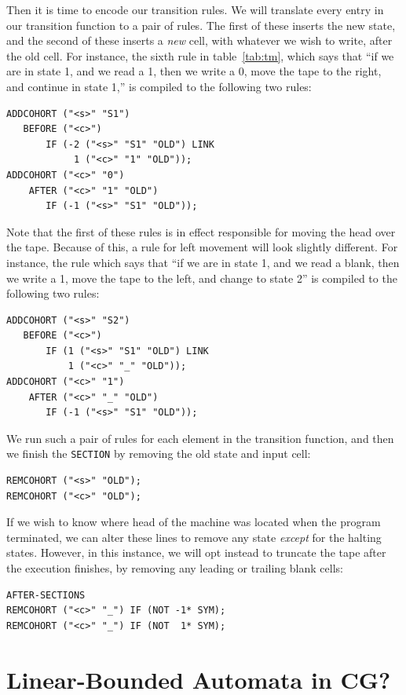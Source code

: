 \documentclass[11pt]{article}
\def\t#1{\texttt{#1}}
\begin{document}
Then it is time to encode our transition rules. We will translate every entry in
our transition function to a pair of rules. The first of these inserts the new
state, and the second of these inserts a \emph{new} cell, with whatever we wish
to write, after the old cell. For instance, the sixth rule in
table~\ref{tab:tm}, which says that ``if we are in state 1, and we read a 1,
then we write a 0, move the tape to the right, and continue in state 1,'' is
compiled to the following two rules:
\begin{Verbatim}
ADDCOHORT ("<s>" "S1")
   BEFORE ("<c>")
       IF (-2 ("<s>" "S1" "OLD") LINK 
            1 ("<c>" "1" "OLD"));
ADDCOHORT ("<c>" "0")
    AFTER ("<c>" "1" "OLD")
       IF (-1 ("<s>" "S1" "OLD"));
\end{Verbatim}
Note that the first of these rules is in effect responsible for moving the head
over the tape. Because of this, a rule for left movement will look slightly
different. For instance, the rule which says that ``if we are in state 1, and we
read a blank, then we write a 1, move the tape to the left, and change to state
2'' is compiled to the following two rules:
\begin{Verbatim}
ADDCOHORT ("<s>" "S2")
   BEFORE ("<c>")
       IF (1 ("<s>" "S1" "OLD") LINK
           1 ("<c>" "_" "OLD"));
ADDCOHORT ("<c>" "1")
    AFTER ("<c>" "_" "OLD")
       IF (-1 ("<s>" "S1" "OLD"));
\end{Verbatim}
We run such a pair of rules for each element in the transition function, and
then we finish the \t{SECTION} by removing the old state and input cell:
\begin{Verbatim}
REMCOHORT ("<s>" "OLD");
REMCOHORT ("<c>" "OLD");
\end{Verbatim}
If we wish to know where head of the machine was located when the program
terminated, we can alter these lines to remove any state \emph{except} for the
halting states. However, in this instance, we will opt instead to truncate the
tape after the execution finishes, by removing any leading or trailing blank
cells:
\begin{Verbatim}
AFTER-SECTIONS
REMCOHORT ("<c>" "_") IF (NOT -1* SYM);
REMCOHORT ("<c>" "_") IF (NOT  1* SYM);
\end{Verbatim}

\section{Linear-Bounded Automata in CG?}
\end{document}
